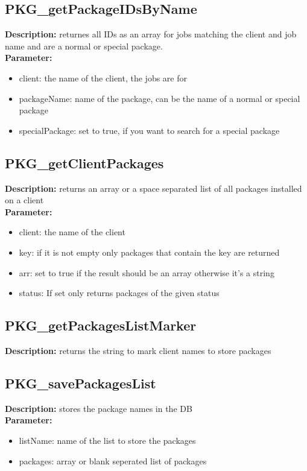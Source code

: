 \subsection{PKG\_getPackageIDsByName}
\textbf{Description:} returnes all IDs as an array for jobs matching the client and job name and are a normal or special package.\\
\textbf{Parameter:}
\begin{itemize}
\item client: the name of the client, the jobs are for
\item packageName: name of the package, can be the name of a normal or special package
\item specialPackage: set to true, if you want to search for a special package
\end{itemize}

\subsection{PKG\_getClientPackages}
\textbf{Description:} returns an array or a space separated list of all packages installed on a client\\
\textbf{Parameter:}
\begin{itemize}
\item client: the name of the client
\item key: if it is not empty only packages that contain the key are returned
\item arr: set to true if the result should be an array otherwise it's a string
\item status: If set only returns packages of the given status
\end{itemize}

\subsection{PKG\_getPackagesListMarker}
\textbf{Description:} returns the string to mark client names to store packages\\

\subsection{PKG\_savePackagesList}
\textbf{Description:} stores the package names in the DB\\
\textbf{Parameter:}
\begin{itemize}
\item listName: name of the list to store the packages 
\item packages: array or blank seperated list of packages
\end{itemize}

